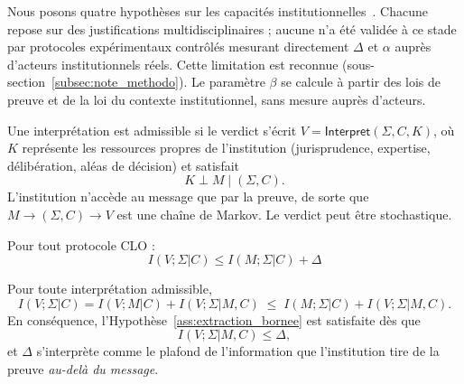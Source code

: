 \begin{sloppypar}
Nous posons quatre hypoth\`eses sur les capacit\'es
institutionnelles~\cite{Simon1955,Miller56,Ericsson95}. Chacune repose
sur des justifications multidisciplinaires ; aucune n'a \'et\'e valid\'ee
\`a ce stade par protocoles exp\'erimentaux contr\^ol\'es mesurant
directement $\Delta$ et $\alpha$ aupr\`es d'acteurs
institutionnels r\'eels. Cette limitation est reconnue
(sous-section~\ref{subsec:note_methodo}). Le param\`etre $\beta$ se calcule \`a partir
des lois de preuve et de la loi du contexte institutionnel, sans mesure aupr\`es d'acteurs.

\begin{definition}\label{def:interp_admissible}
Une interpr\'etation est admissible si le verdict s'\'ecrit
$V = \mathsf{Interpret}(\Sigma, C, K)$, o\`u $K$ repr\'esente les ressources
propres de l'institution (jurisprudence, expertise, d\'elib\'eration,
al\'eas de d\'ecision) et satisfait
\begin{equation}
K \perp M \mid (\Sigma, C).
\label{eq:interp_admissible}
\end{equation}
L'institution n'acc\`ede au message que par la preuve, de sorte que $M \to (\Sigma,C) \to V$
est une cha\^ine de Markov. Le verdict peut \^etre stochastique.
\end{definition}

\begin{assumption}
\label{ass:extraction_bornee}
Pour tout protocole CLO :
\begin{equation}
I(V;\Sigma|C) \leq I(M;\Sigma|C) + \Delta
\label{eq:extraction_bornee}
\end{equation}
\end{assumption}

\begin{proposition}
\label{prop:fondement_extraction}
Pour toute interpr\'etation admissible,
\begin{equation}
I(V;\Sigma|C) = I(V;M|C) + I(V;\Sigma|M,C) \;\leq\; I(M;\Sigma|C) + I(V;\Sigma|M,C).
\label{eq:fondement_extraction}
\end{equation}
En cons\'equence, l'Hypoth\`ese~\ref{ass:extraction_bornee} est satisfaite
d\`es que
\begin{equation}
I(V;\Sigma|M,C) \leq \Delta,
\label{eq:extraction_bornee_forte}
\end{equation}
et $\Delta$ s'interpr\`ete comme le plafond de l'information que
l'institution tire de la preuve \emph{au-del\`a du message}.
\end{proposition}


\end{sloppypar}
